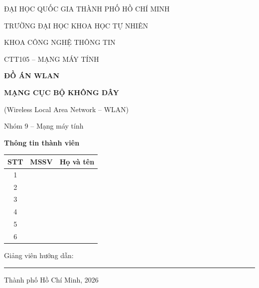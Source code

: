 \begin{titlepage}
  \centering
  {\large ĐẠI HỌC QUỐC GIA THÀNH PHỐ HỒ CHÍ MINH\par}
  \vspace{0.2cm}
  {\large TRƯỜNG ĐẠI HỌC KHOA HỌC TỰ NHIÊN\par}
  \vspace{0.2cm}
  {\large KHOA CÔNG NGHỆ THÔNG TIN\par}
  \vspace{1.6cm}
  {\large CTT105 -- MẠNG MÁY TÍNH\par}
  \vspace{0.5cm}
  {\Large\bfseries ĐỒ ÁN WLAN\par}
  \vspace{0.25cm}
  {\huge\bfseries MẠNG CỤC BỘ KHÔNG DÂY\par}
  {\Large (Wireless Local Area Network -- WLAN)\par}
  \vspace{0.6cm}
  {\Large Nhóm 9 -- Mạng máy tính\par}
  \vspace{0.5cm}
  {\large\bfseries Thông tin thành viên\par}
  \vspace{0.2cm}
  \renewcommand{\arraystretch}{1.6}
  \begin{tabularx}{\linewidth}{c X X}
    \toprule
    STT & MSSV & Họ và tên \\
    \midrule
    1 & & \\
    2 & & \\
    3 & & \\
    4 & & \\
    5 & & \\
    6 & & \\
    \bottomrule
  \end{tabularx}
  \vfill
  {\large Giảng viên hướng dẫn: \rule{6.5cm}{0.4pt}\par}
  \vspace{0.4cm}
  {\large Thành phố Hồ Chí Minh, 2026\par}
\end{titlepage}
